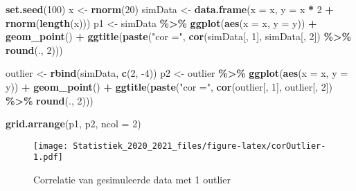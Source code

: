 \documentclass[
  12pt,dutch,coursenotes]{book}
\newenvironment{Shaded}{\begin{snugshade}}{\end{snugshade}}
\newcommand{\DataTypeTok}[1]{\textcolor[rgb]{0.13,0.29,0.53}{#1}}
\newcommand{\DecValTok}[1]{\textcolor[rgb]{0.00,0.00,0.81}{#1}}
\newcommand{\KeywordTok}[1]{\textcolor[rgb]{0.13,0.29,0.53}{\textbf{#1}}}
\newcommand{\NormalTok}[1]{#1}
\newcommand{\OperatorTok}[1]{\textcolor[rgb]{0.81,0.36,0.00}{\textbf{#1}}}
\newcommand{\StringTok}[1]{\textcolor[rgb]{0.31,0.60,0.02}{#1}}
\theoremstyle{definition}
\theoremstyle{definition}
\theoremstyle{definition}
\theoremstyle{remark}
\begin{document}
\begin{Shaded}
\begin{Highlighting}[]
\KeywordTok{set.seed}\NormalTok{(}\DecValTok{100}\NormalTok{)}
\NormalTok{x \textless{}{-}}\StringTok{ }\KeywordTok{rnorm}\NormalTok{(}\DecValTok{20}\NormalTok{)}
\NormalTok{simData \textless{}{-}}\StringTok{ }\KeywordTok{data.frame}\NormalTok{(}\DataTypeTok{x =}\NormalTok{ x, }\DataTypeTok{y =}\NormalTok{ x }\OperatorTok{*}\StringTok{ }\DecValTok{2} \OperatorTok{+}\StringTok{ }\KeywordTok{rnorm}\NormalTok{(}\KeywordTok{length}\NormalTok{(x)))}
\NormalTok{p1 \textless{}{-}}\StringTok{ }\NormalTok{simData }\OperatorTok{\%\textgreater{}\%}\StringTok{ }\KeywordTok{ggplot}\NormalTok{(}\KeywordTok{aes}\NormalTok{(}\DataTypeTok{x =}\NormalTok{ x, }\DataTypeTok{y =}\NormalTok{ y)) }\OperatorTok{+}\StringTok{ }\KeywordTok{geom\_point}\NormalTok{() }\OperatorTok{+}\StringTok{ }
\StringTok{    }\KeywordTok{ggtitle}\NormalTok{(}\KeywordTok{paste}\NormalTok{(}\StringTok{"cor ="}\NormalTok{, }\KeywordTok{cor}\NormalTok{(simData[, }\DecValTok{1}\NormalTok{], simData[, }
        \DecValTok{2}\NormalTok{]) }\OperatorTok{\%\textgreater{}\%}\StringTok{ }\KeywordTok{round}\NormalTok{(., }\DecValTok{2}\NormalTok{)))}

\NormalTok{outlier \textless{}{-}}\StringTok{ }\KeywordTok{rbind}\NormalTok{(simData, }\KeywordTok{c}\NormalTok{(}\DecValTok{2}\NormalTok{, }\DecValTok{{-}4}\NormalTok{))}
\NormalTok{p2 \textless{}{-}}\StringTok{ }\NormalTok{outlier }\OperatorTok{\%\textgreater{}\%}\StringTok{ }\KeywordTok{ggplot}\NormalTok{(}\KeywordTok{aes}\NormalTok{(}\DataTypeTok{x =}\NormalTok{ x, }\DataTypeTok{y =}\NormalTok{ y)) }\OperatorTok{+}\StringTok{ }\KeywordTok{geom\_point}\NormalTok{() }\OperatorTok{+}\StringTok{ }
\StringTok{    }\KeywordTok{ggtitle}\NormalTok{(}\KeywordTok{paste}\NormalTok{(}\StringTok{"cor ="}\NormalTok{, }\KeywordTok{cor}\NormalTok{(outlier[, }\DecValTok{1}\NormalTok{], outlier[, }
        \DecValTok{2}\NormalTok{]) }\OperatorTok{\%\textgreater{}\%}\StringTok{ }\KeywordTok{round}\NormalTok{(., }\DecValTok{2}\NormalTok{)))}

\KeywordTok{grid.arrange}\NormalTok{(p1, p2, }\DataTypeTok{ncol =} \DecValTok{2}\NormalTok{)}
\end{Highlighting}
\end{Shaded}

\begin{figure}
\centering
\texttt{[image: Statistiek\_2020\_2021\_files/figure-latex/corOutlier-1.pdf]}
\caption{\label{fig:corOutlier}Correlatie van gesimuleerde data met 1 outlier}
\end{figure}
\end{document}
